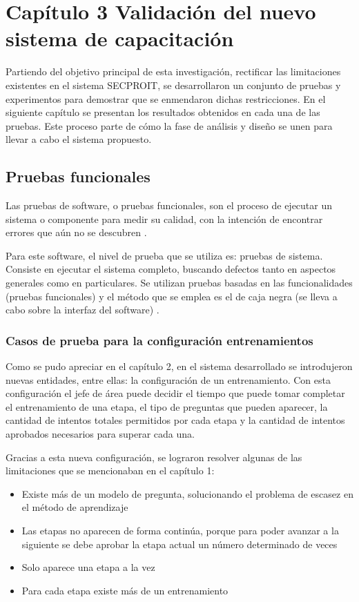 \chapter*{Capítulo 3 \vspace{0.5cm} \break Validación del nuevo sistema de capacitación}
\setcounter{chapter}{3}
\setcounter{section}{0}

Partiendo del objetivo principal de esta investigación, rectificar las limitaciones existentes en el sistema SECPROIT, se desarrollaron un conjunto de pruebas y experimentos para demostrar que se enmendaron dichas restricciones. En el siguiente capítulo se presentan los resultados obtenidos en cada una de las pruebas. Este proceso parte de cómo la fase de análisis y diseño se unen para llevar a cabo el sistema propuesto.

\section{Pruebas funcionales}
 Las pruebas de software, o pruebas funcionales, son el proceso de ejecutar un sistema o componente para medir su calidad, con la intención de encontrar errores que aún no se descubren \cite{Buehler2008}.

Para este software, el nivel de prueba que se utiliza es: pruebas de sistema. Consiste en ejecutar el sistema completo, buscando defectos tanto en aspectos generales como en particulares. Se utilizan pruebas basadas en las funcionalidades (pruebas funcionales) y el método que se emplea es el de caja negra (se lleva a cabo sobre la interfaz del software) \cite{Nidhra2012}.

\subsection{Casos de prueba para la configuración entrenamientos}
Como se pudo apreciar en el capítulo 2, en el sistema desarrollado se introdujeron nuevas entidades, entre ellas: la configuración de un entrenamiento. Con esta configuración el jefe de área puede decidir el tiempo que puede tomar completar el entrenamiento de una etapa, el tipo de preguntas que pueden aparecer, la cantidad de intentos totales permitidos por cada etapa y la cantidad de intentos aprobados necesarios para superar cada una.

Gracias a esta nueva configuración, se lograron resolver algunas de las limitaciones que se mencionaban en el capítulo 1: 
\begin{itemize}
\item Existe más de un modelo de pregunta, solucionando el problema de escasez en el método de aprendizaje
\item Las etapas no aparecen de forma continúa, porque para poder avanzar a la siguiente se debe aprobar la etapa actual un número determinado de veces
\item Solo aparece una etapa a la vez
\item Para cada etapa existe más de un entrenamiento
\end{itemize}

